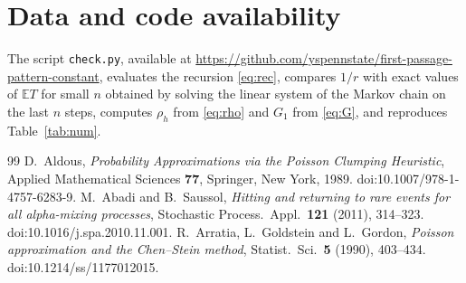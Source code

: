 \documentclass[11pt]{amsart}
\theoremstyle{remark}
\numberwithin{equation}{section}
\newcommand{\EE}{\mathbb{E}}
\begin{document}
\section*{Data and code availability}

The script \texttt{check.py}, available at \url{https://github.com/yspennstate/first-passage-pattern-constant}, evaluates the recursion \eqref{eq:rec}, compares $1/r$ with exact values of $\EE T$ for small $n$ obtained by solving the linear system of the Markov chain on the last $n$ steps, computes $\rho_h$ from \eqref{eq:rho} and $G_1$ from \eqref{eq:G}, and reproduces Table~\ref{tab:num}.

\begin{thebibliography}{99}
 D.~Aldous, \emph{Probability Approximations via the Poisson Clumping Heuristic}, Applied Mathematical Sciences \textbf{77}, Springer, New York, 1989. doi:10.1007/978-1-4757-6283-9.
 M.~Abadi and B.~Saussol, \emph{Hitting and returning to rare events for all alpha-mixing processes}, Stochastic Process.\ Appl.\ \textbf{121} (2011), 314--323. doi:10.1016/j.spa.2010.11.001.
 R.~Arratia, L.~Goldstein and L.~Gordon, \emph{Poisson approximation and the Chen--Stein method}, Statist.\ Sci.\ \textbf{5} (1990), 403--434. doi:10.1214/ss/1177012015.


\end{thebibliography}
\end{document}
